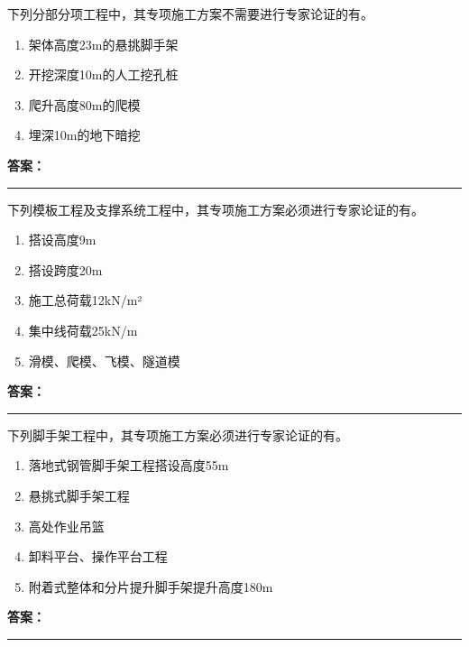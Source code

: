 \documentclass[UTF8,fontset=fandol,11pt]{ctexart}
\newcommand{\answerline}{\textcolor{answerred}{\rule{2.4cm}{0.7pt}}}
\begin{document}
\vspace{0.2em}

\begin{quizbox}[title={第 3 题}]
下列分部分项工程中，其专项施工方案不需要进行专家论证的有。\\
\begin{enumerate}[label=\Alph*.]
\item 架体高度23m的悬挑脚手架
\item 开挖深度10m的人工挖孔桩
\item 爬升高度80m的爬模
\item 埋深10m的地下暗挖
\end{enumerate}
\textbf{\textcolor{answerred}{答案：}} \answerline
\end{quizbox}

\vspace{0.2em}

\begin{quizbox}[title={第 4 题}]
下列模板工程及支撑系统工程中，其专项施工方案必须进行专家论证的有。\\
\begin{enumerate}[label=\Alph*.]
\item 搭设高度9m
\item 搭设跨度20m
\item 施工总荷载12kN/m²
\item 集中线荷载25kN/m
\item 滑模、爬模、飞模、隧道模
\end{enumerate}
\textbf{\textcolor{answerred}{答案：}} \answerline
\end{quizbox}

\vspace{0.2em}

\begin{quizbox}[title={第 5 题}]
下列脚手架工程中，其专项施工方案必须进行专家论证的有。\\
\begin{enumerate}[label=\Alph*.]
\item 落地式钢管脚手架工程搭设高度55m
\item 悬挑式脚手架工程
\item 高处作业吊篮
\item 卸料平台、操作平台工程
\item 附着式整体和分片提升脚手架提升高度180m
\end{enumerate}
\textbf{\textcolor{answerred}{答案：}} \answerline
\end{quizbox}

\vspace{0.2em}
\end{document}
